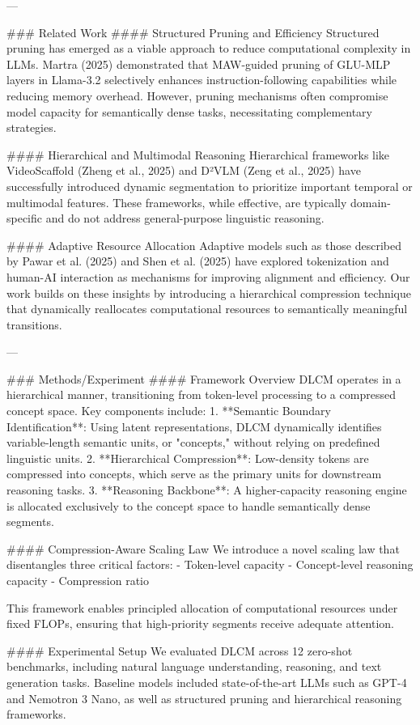 ---

### Related Work
#### Structured Pruning and Efficiency
Structured pruning has emerged as a viable approach to reduce computational complexity in LLMs. Martra (2025) demonstrated that MAW-guided pruning of GLU-MLP layers in Llama-3.2 selectively enhances instruction-following capabilities while reducing memory overhead. However, pruning mechanisms often compromise model capacity for semantically dense tasks, necessitating complementary strategies.

#### Hierarchical and Multimodal Reasoning
Hierarchical frameworks like VideoScaffold (Zheng et al., 2025) and D²VLM (Zeng et al., 2025) have successfully introduced dynamic segmentation to prioritize important temporal or multimodal features. These frameworks, while effective, are typically domain-specific and do not address general-purpose linguistic reasoning.

#### Adaptive Resource Allocation
Adaptive models such as those described by Pawar et al. (2025) and Shen et al. (2025) have explored tokenization and human-AI interaction as mechanisms for improving alignment and efficiency. Our work builds on these insights by introducing a hierarchical compression technique that dynamically reallocates computational resources to semantically meaningful transitions.

---

### Methods/Experiment
#### Framework Overview
DLCM operates in a hierarchical manner, transitioning from token-level processing to a compressed concept space. Key components include:
1. **Semantic Boundary Identification**: Using latent representations, DLCM dynamically identifies variable-length semantic units, or "concepts," without relying on predefined linguistic units.
2. **Hierarchical Compression**: Low-density tokens are compressed into concepts, which serve as the primary units for downstream reasoning tasks.
3. **Reasoning Backbone**: A higher-capacity reasoning engine is allocated exclusively to the concept space to handle semantically dense segments.

#### Compression-Aware Scaling Law
We introduce a novel scaling law that disentangles three critical factors:
- Token-level capacity
- Concept-level reasoning capacity
- Compression ratio

This framework enables principled allocation of computational resources under fixed FLOPs, ensuring that high-priority segments receive adequate attention.

#### Experimental Setup
We evaluated DLCM across 12 zero-shot benchmarks, including natural language understanding, reasoning, and text generation tasks. Baseline models included state-of-the-art LLMs such as GPT-4 and Nemotron 3 Nano, as well as structured pruning and hierarchical reasoning frameworks.


